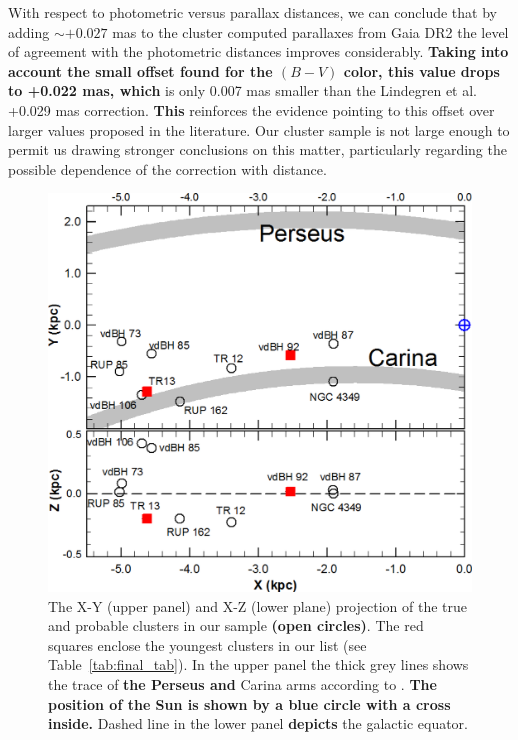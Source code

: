 \documentclass[referee]{aa}
\begin{document}
With respect to photometric versus parallax distances, we can conclude that by
adding $\sim+0.027$ mas to the cluster computed parallaxes from Gaia DR2
the level of agreement with the photometric distances improves considerably.
\textbf{Taking into account the small offset found for the $(B-V)$ color, this
value drops to +0.022 mas, which} is only 0.007 mas smaller than the
Lindegren et al. +0.029 mas correction.
\textbf{This} reinforces the evidence pointing to this offset over larger
values proposed in the literature. Our cluster sample is not large enough
to permit us drawing stronger conclusions on this matter, particularly
regarding the possible dependence of the correction with distance.


\begin{figure}[ht]
    \centering
    \includegraphics[width=\hsize]{../figs/xy_xz.png}
\caption{The X-Y (upper panel) and X-Z (lower plane) projection of the true and
probable clusters in our sample \textbf{(open circles)}. The red squares
enclose the youngest clusters in our list (see Table~\ref{tab:final_tab}).
In the upper panel the thick grey lines shows the trace of \textbf{the Perseus and}
Carina arms according to \cite{valle_2005}.
\textbf{The position of the Sun is shown by a blue circle with a cross inside.}
Dashed line in the lower panel \textbf{depicts} the galactic equator.}
\label{fig68}
\end{figure}
\end{document}
